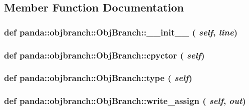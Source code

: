 \subsection{Member Function Documentation}
\hypertarget{classpanda_1_1objbranch_1_1ObjBranch_a09fa7f1568418614396e84499be09489}{
\subsubsection[{\_\-\_\-init\_\-\_\-}]{\setlength{\rightskip}{0pt plus 5cm}def panda::objbranch::ObjBranch::\_\-\_\-init\_\-\_\- ( {\em self}, \/   {\em line})}}
\label{classpanda_1_1objbranch_1_1ObjBranch_a09fa7f1568418614396e84499be09489}
\hypertarget{classpanda_1_1objbranch_1_1ObjBranch_a89087bd43f650e6270c06a412022d617}{
\subsubsection[{cpyctor}]{\setlength{\rightskip}{0pt plus 5cm}def panda::objbranch::ObjBranch::cpyctor ( {\em self})}}
\label{classpanda_1_1objbranch_1_1ObjBranch_a89087bd43f650e6270c06a412022d617}
\hypertarget{classpanda_1_1objbranch_1_1ObjBranch_a206aa6a416f02b90d965654e2c0b6a59}{
\subsubsection[{type}]{\setlength{\rightskip}{0pt plus 5cm}def panda::objbranch::ObjBranch::type ( {\em self})}}
\label{classpanda_1_1objbranch_1_1ObjBranch_a206aa6a416f02b90d965654e2c0b6a59}
\hypertarget{classpanda_1_1objbranch_1_1ObjBranch_a1a98e6388842d910aadfd1eb89a1bec5}{
\subsubsection[{write\_\-assign}]{\setlength{\rightskip}{0pt plus 5cm}def panda::objbranch::ObjBranch::write\_\-assign ( {\em self}, \/   {\em out})}}
